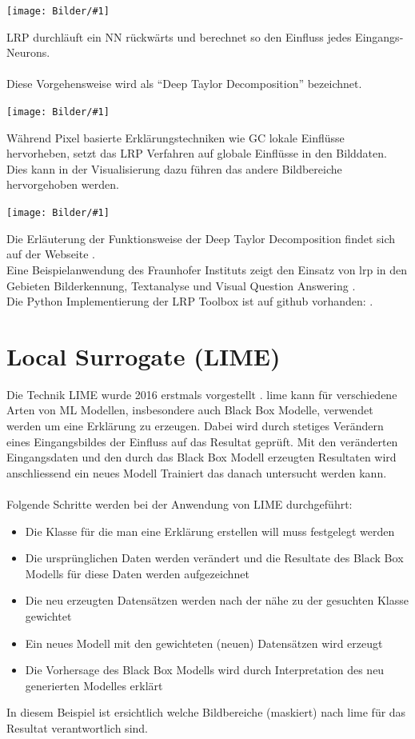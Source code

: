 \documentclass[
  12pt, %
  a4paper, %
  oneside, %
  openany, 
  numbers=noenddot, %
  BCOR=5mm, %
  parskip=half*, %
  thesis, %
]{bfhbook}
\newcommand{\imgTextQuelle}[4]{
\begin{center}
    \begin{minipage}[t]{0.6\textwidth}
    		\vspace{0pt}
		\texttt{[image: Bilder/\#1]}
		\caption{#2}
		\caption*{Quelle: #3}
	\end{minipage}\hfill
    \begin{minipage}[t]{0.4\textwidth}
    		\vspace{5pt}
  		#4
    \end{minipage}
\end{center}
}
\newcommand{\fullImgQuelle}[3]{
\begin{center}
  \begin{minipage}{\linewidth}
    \centering
    \texttt{[image: Bilder/\#1]}
    \caption{#2}
    \caption*{Quelle: #3}
  \end{minipage}
\end{center}
}
\begin{document}
\imgTextQuelle{lrpgraph.PNG}{LRP Berechnung}{www.heatmapping.org}{LRP durchläuft ein \gls{NN} rückwärts und berechnet so den Einfluss jedes Eingangs-Neurons.
\\\\
 Diese Vorgehensweise wird als ``Deep Taylor Decomposition'' bezeichnet.
 }
 
\fullImgQuelle{lrp-classification-example-cat.PNG}{Pixel basierte Relevanz}{Bach \parencite{Bach2015}}
 Während Pixel basierte Erklärungstechniken wie \Gls{GC} lokale Einflüsse hervorheben, setzt das LRP Verfahren auf globale Einflüsse in den Bilddaten. Dies kann in der Visualisierung dazu führen das andere Bildbereiche hervorgehoben werden.
\fullImgQuelle{lrp-example-cat.PNG}{Vergleich Pixel-wise und LRP }{Bach \parencite{Bach2015}}

Die  Erläuterung der Funktionsweise der Deep Taylor Decomposition findet sich auf der Webseite \parencite{deepTaylor}.
\\
 Eine Beispielanwendung des Fraunhofer Instituts zeigt den Einsatz von \acrshort{lrp} in den Gebieten Bilderkennung, Textanalyse und Visual Question Answering \parencite{xaidemos}.
\\
Die Python Implementierung der LRP Toolbox \parencite{JMLR:v17:15-618} ist auf github vorhanden: \parencite{lrpToolbox}.

\section{Local Surrogate (LIME)}
\label{lime}
Die Technik LIME wurde 2016 erstmals vorgestellt \parencite{Ribeiro2016}. 
\Gls{lime} kann für verschiedene Arten von  \Gls{ML} Modellen, insbesondere auch Black Box Modelle, verwendet werden um eine Erklärung zu erzeugen. Dabei wird durch stetiges Verändern eines Eingangsbildes der Einfluss auf das Resultat geprüft. Mit den veränderten Eingangsdaten und den durch das Black Box Modell erzeugten Resultaten wird anschliessend ein neues Modell Trainiert das danach untersucht werden kann.

\paragraph*{}
Folgende Schritte werden bei der Anwendung von LIME durchgeführt:
\begin{itemize}
	\item Die Klasse für die man eine Erklärung erstellen will muss festgelegt werden
	\item Die ursprünglichen Daten werden verändert und die Resultate des Black Box Modells für diese Daten werden aufgezeichnet
	\item Die neu erzeugten Datensätzen werden nach der nähe zu der gesuchten Klasse gewichtet
	\item Ein neues Modell mit den gewichteten (neuen) Datensätzen wird erzeugt
	\item Die Vorhersage des Black Box Modells wird durch Interpretation des neu generierten Modelles erklärt
\end{itemize}
\break
In diesem Beispiel ist ersichtlich welche Bildbereiche (maskiert) nach \gls{lime} für das Resultat verantwortlich sind.
\end{document}
